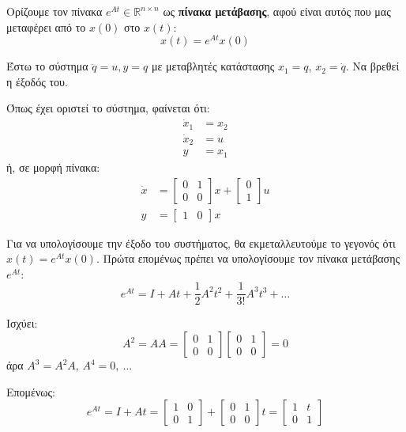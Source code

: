 \documentclass[11pt,a4paper,notitlepage,fleqn]{article}
\begin{document}
Ορίζουμε τον πίνακα \( e^{At} \in \mathbb R^{n\times n} \) ως
\textbf{πίνακα μετάβασης}, αφού είναι αυτός που μας μεταφέρει από
το \( x(0) \) στο \( x(t) \):
\[
x(t) = e^{At} x(0)
\]

\begin{exercise}[Παράδειγμα]
	Έστω το σύστημα \( \ddot q = u, y=q \) με μεταβλητές κατάστασης
	\( x_1=q \), \( x_2 = \dot q \). Να βρεθεί η έξοδός του.
	\tcblower
	
	Όπως έχει οριστεί το σύστημα, φαίνεται ότι:
	\begin{align*}
		\dot x_1 &= x_2\\
		\dot x_2 &= u\\
		y &= x_1
	\end{align*}
	ή, σε μορφή πίνακα:
	\begin{align*}
		\dot x &= \left[\begin{matrix}
		0 & 1 \\ 0 & 0
		\end{matrix}\right]x + \left[\begin{matrix}
		0 \\ 1
		\end{matrix}\right]u\\
		y &= \left[\begin{matrix}
		1 & 0
		\end{matrix}\right] x
	\end{align*}
	
	Για να υπολογίσουμε την έξοδο του συστήματος, θα εκμεταλλευτούμε το γεγονός ότι
	\( x(t) = e^{At} x(0) \). Πρώτα επομένως πρέπει να υπολογίσουμε τον πίνακα μετάβασης
	\( e^{At} \):
	\[
	e^{At} = I + At + \frac{1}{2} A^2t^2 + \frac{1}{3!} A^3t^3 + \dots
	\]
	
	Ισχύει:
	\[
	A^2 = AA = \left[\begin{matrix}
	0 & 1 \\ 0 & 0
	\end{matrix}\right]\left[\begin{matrix}
	0 & 1 \\ 0 & 0
	\end{matrix}\right] = 0
	\]
	άρα \( A^3 = A^2 A \), \( A^4 = 0,\ \dots \)
	
	Επομένως:
	\[
	e^{At} = I + At = \left[\begin{matrix}
	1 & 0 \\ 0 & 1
	\end{matrix}\right] + \left[\begin{matrix}
	0 & 1 \\ 0 & 0
	\end{matrix}\right] t = \left[\begin{matrix}
	1 & t \\ 0 & 1
	\end{matrix}\right]
	\]
	

\end{exercise}
\end{document}
